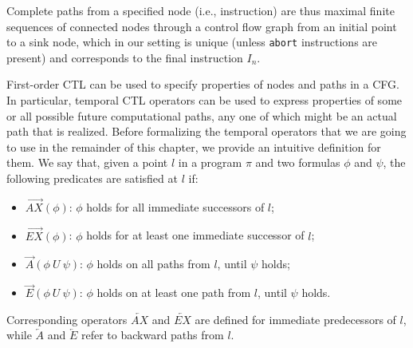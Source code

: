 \noindent Complete paths from a specified node (i.e., instruction) are thus maximal finite sequences of connected nodes through a control flow graph from an initial point to a sink node, which in our setting is unique (unless {\tt abort} instructions are present) and corresponds to the final instruction $I_n$.

First-order CTL can be used to specify properties of nodes and paths in a CFG. In particular, temporal CTL operators can be used to express properties of some or all possible future computational paths, any one of which might be an actual path that is realized. Before formalizing the temporal operators that we are going to use in the remainder of this chapter, we provide an intuitive definition for them. We say that, given a point $l$ in a program $\pi$ and two formulas $\phi$ and $\psi$, the following predicates are satisfied at $l$ if:

\begin{itemize}[parsep=0pt,topsep=3pt]
\item $\overrightarrow{AX}(\phi)$: $\phi$ holds for all immediate successors of $l$;
\item $\overrightarrow{EX}(\phi)$: $\phi$ holds for at least one immediate successor of $l$;
\item $\overrightarrow{A}(\phi~U~\psi)$: $\phi$ holds on all paths from $l$, until $\psi$ holds;
\item $\overrightarrow{E}(\phi~U~\psi)$: $\phi$ holds on at least one path from $l$, until $\psi$ holds.
\end{itemize}
\noindent Corresponding operators $\overleftarrow{AX}$ and $\overleftarrow{EX}$ are defined for immediate predecessors of $l$, while $\overleftarrow{A}$ and $\overleftarrow{E}$ refer to backward paths from $l$.

\begin{example}
 \missing
\end{example}


